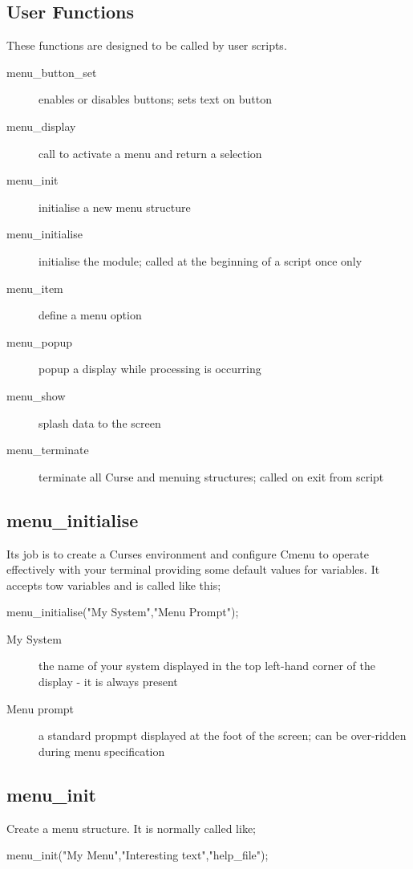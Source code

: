 \documentclass[a4paper]{scrartcl}
\begin{document}
\subsection{User Functions}
These functions are designed to be called by user scripts.
\begin{description}
\item [menu\_button\_set] enables or disables buttons; sets text on button
\item [menu\_display] call to activate a menu and return a selection
\item [menu\_init] initialise a new menu structure
\item [menu\_initialise] initialise the module; called at the beginning of a script once only
\item [menu\_item] define a menu option
\item [menu\_popup] popup a display while processing is occurring
\item [menu\_show] splash data to the screen
\item [menu\_terminate] terminate all Curse and menuing structures; called on exit from script
\end{description}

\subsection{menu\_initialise}
Its job is to create a Curses environment and configure Cmenu to operate effectively with your terminal providing some default values for variables. It accepts tow variables and is called like this;
\begin{center}
menu\_initialise("My System","Menu Prompt");
\end{center}

\begin{description}
\item [My System] the name of your system displayed in the top left-hand corner of the display - it is always present
\item [Menu prompt] a standard propmpt displayed at the foot of the screen; can be over-ridden during menu specification
\end{description}

\subsection{menu\_init}
Create a menu structure. It is normally called like;
\begin{center}
menu\_init("My Menu","Interesting text","help\_file");
\end{center}
\end{document}
